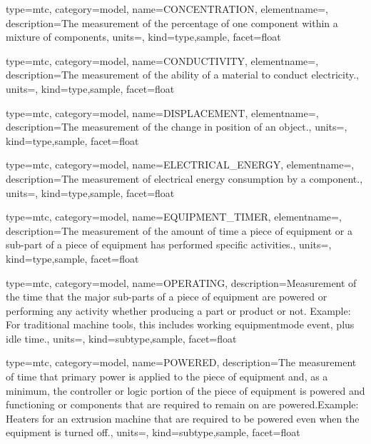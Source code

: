 {
  type=mtc,
  category=model,
  name={CONCENTRATION},
  elementname=,
  description={The measurement of the percentage of one component within a mixture of components},
  units=,
  kind={type,sample},
  facet={\gls{float}}
}


{
  type=mtc,
  category=model,
  name={CONDUCTIVITY},
  elementname=,
  description={The measurement of the ability of a material to conduct electricity.},
  units=,
  kind={type,sample},
  facet={\gls{float}}
}


{
  type=mtc,
  category=model,
  name={DISPLACEMENT},
  elementname=,
  description={The measurement of the change in position of an object.},
  units=,
  kind={type,sample},
  facet={\gls{float}}
}


{
  type=mtc,
  category=model,
  name={ELECTRICAL\_ENERGY},
  elementname=,
  description={The measurement of electrical energy consumption by a component.},
  units=,
  kind={type,sample},
  facet={\gls{float}}
}


{
  type=mtc,
  category=model,
  name={EQUIPMENT\_TIMER},
  elementname=,
  description={The measurement of the amount of time a piece of equipment or a sub-part of a piece of equipment has performed specific activities.},
  units=,
  kind={type,sample},
  facet={\gls{float}}
}



{
  type=mtc,
  category=model,
  name={OPERATING},
  description={Measurement of the time that the major sub-parts of a piece of equipment are powered or performing any activity whether producing a part or product or not.   \newline Example: For traditional machine tools, this includes \gls{working equipmentmode event}, plus idle time.},
  units=,
  kind={subtype,sample},
  facet={\gls{float}}
}


{
  type=mtc,
  category=model,
  name={POWERED},
  description={The measurement of time that primary power is applied to the piece of equipment and, as a minimum, the controller or logic portion of the piece of equipment is powered and functioning or components that are required to remain on are powered.Example: Heaters for an extrusion machine that are required to be powered even when the equipment is turned off.},
  units=,
  kind={subtype,sample},
  facet={\gls{float}}
}


